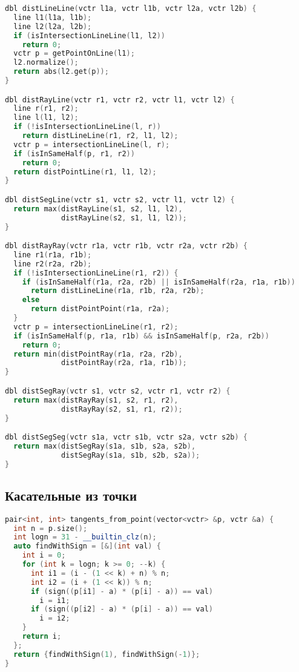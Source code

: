 \documentclass[10pt,a4paper,landscape,twosided]{extarticle}
\begin{document}
\begin{multicols*}{3}
\begin{lstlisting}[language=C++]
dbl distLineLine(vctr l1a, vctr l1b, vctr l2a, vctr l2b) {
  line l1(l1a, l1b);
  line l2(l2a, l2b);
  if (isIntersectionLineLine(l1, l2))
    return 0;
  vctr p = getPointOnLine(l1);
  l2.normalize();
  return abs(l2.get(p));
}

dbl distRayLine(vctr r1, vctr r2, vctr l1, vctr l2) {
  line r(r1, r2);
  line l(l1, l2);
  if (!isIntersectionLineLine(l, r))
    return distLineLine(r1, r2, l1, l2);
  vctr p = intersectionLineLine(l, r);
  if (isInSameHalf(p, r1, r2))
    return 0;
  return distPointLine(r1, l1, l2);
}

dbl distSegLine(vctr s1, vctr s2, vctr l1, vctr l2) {
  return max(distRayLine(s1, s2, l1, l2),
             distRayLine(s2, s1, l1, l2));
}

dbl distRayRay(vctr r1a, vctr r1b, vctr r2a, vctr r2b) {
  line r1(r1a, r1b);
  line r2(r2a, r2b);
  if (!isIntersectionLineLine(r1, r2)) {
    if (isInSameHalf(r1a, r2a, r2b) || isInSameHalf(r2a, r1a, r1b))
      return distLineLine(r1a, r1b, r2a, r2b);
    else
      return distPointPoint(r1a, r2a);
  }
  vctr p = intersectionLineLine(r1, r2);
  if (isInSameHalf(p, r1a, r1b) && isInSameHalf(p, r2a, r2b))
    return 0;
  return min(distPointRay(r1a, r2a, r2b),
             distPointRay(r2a, r1a, r1b));
}

dbl distSegRay(vctr s1, vctr s2, vctr r1, vctr r2) {
  return max(distRayRay(s1, s2, r1, r2),
             distRayRay(s2, s1, r1, r2));
}

dbl distSegSeg(vctr s1a, vctr s1b, vctr s2a, vctr s2b) {
  return max(distSegRay(s1a, s1b, s2a, s2b),
             distSegRay(s1a, s1b, s2b, s2a));
}

\end{lstlisting}

\subsection{Касательные из точки}
\begin{lstlisting}[language=C++]
pair<int, int> tangents_from_point(vector<vctr> &p, vctr &a) {
  int n = p.size();
  int logn = 31 - __builtin_clz(n);
  auto findWithSign = [&](int val) {
    int i = 0;
    for (int k = logn; k >= 0; --k) {
      int i1 = (i - (1 << k) + n) % n;
      int i2 = (i + (1 << k)) % n;
      if (sign((p[i1] - a) * (p[i] - a)) == val)
        i = i1;
      if (sign((p[i2] - a) * (p[i] - a)) == val)
        i = i2;
    }
    return i;
  };
  return {findWithSign(1), findWithSign(-1)};
}

\end{lstlisting}


\end{multicols*}
\end{document}
